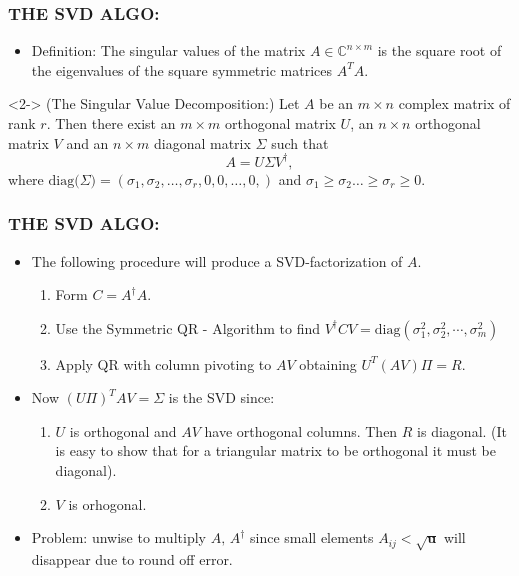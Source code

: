 \documentclass[a4paper,8pt]{beamer} %
\newcommand{\ts}[1]{\textbf{#1}}
\newcommand{\diag}[1]{\text{diag}{#1}}
\begin{document}
\begin{frame} %
\frametitle{THE SVD ALGO:}
\begin{itemize}
	\item <1-> Definition: 
				The singular values of the matrix $A\in\mathbb C^{n\times m}$ is the 
				square root of the eigenvalues of the square symmetric matrices $A^TA$.%
\end{itemize}
		\begin{theorem} 
			(The Singular Value Decomposition:)
			Let $A$ be an $m\times n$ complex matrix of rank $r$. Then there exist an $m\times m$
			orthogonal matrix $U$, an $n\times n$ orthogonal matrix $V$ and an $n\times m$ diagonal 
			matrix $\Sigma$ such that 
			\begin{equation}
				A = U \Sigma V^\dagger,
			\end{equation}
			where $\diag (\Sigma) = (\sigma_1,\sigma_2,\dots,\sigma_r, 0,0,\dots,0,)$ and 
			$\sigma_1\ge\sigma_2\dots\ge\sigma_r\ge0$.
		\end{theorem}
\end{frame}%
\begin{frame}%
\frametitle{THE SVD ALGO:}
\begin{itemize}
	\item <1-> The following procedure will produce a SVD-factorization of $A$. 
		\begin{enumerate}
			\item Form $C=A^\dagger A$.
			\item Use the Symmetric QR - Algorithm to find 
				$V^\dagger CV = \diag{(\sigma_{1}^2,\sigma_{2}^2,\cdots,\sigma_{m}^2)}$
			\item Apply QR with column pivoting to $AV$  obtaining $U^T(AV)\Pi=R$.
		\end{enumerate}
	\item <2-> Now  $(U\Pi)^T A V = \Sigma$ is the SVD since:
		\begin{enumerate}
			\item $U$ is orthogonal and $AV$ have orthogonal columns. Then $R$ is diagonal.  
				(It is easy to show that for a triangular matrix to be orthogonal it must be diagonal).
			\item $V$ is orhogonal.
		\end{enumerate}
	\item <3-> Problem: unwise to multiply $A,\,A^\dagger$ since small elements  
		$A_{ij}<\sqrt{\ts u}$ will disappear due to round off error.
\end{itemize}
\end{frame}%
\end{document}

